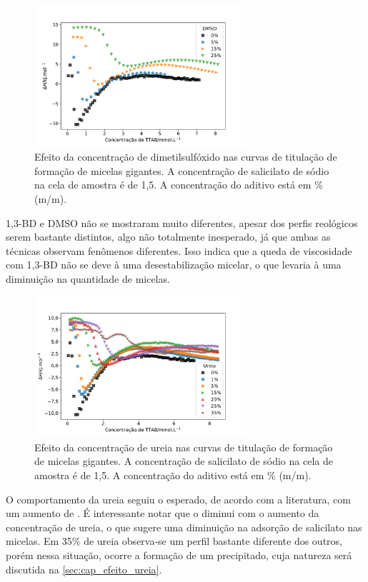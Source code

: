 			\begin{figure}[h]
				\centering
				\includegraphics[width=0.7\textwidth]{imagens/itc/ITC_MG_dmso}
				\caption{Efeito da concentração de dimetilsulfóxido nas curvas de titulação de formação de micelas gigantes. A concentração de salicilato de sódio na cela de amostra é de 1,5\mM. A concentração do aditivo está em \% (m/m).}
				\label{fig:itc_mg_dmso}
			\end{figure}

			1,3-BD e DMSO não se mostraram muito diferentes, apesar dos perfis reológicos serem bastante distintos, algo não totalmente inesperado, já que ambas as técnicas observam fenômenos diferentes. Isso indica que a queda de viscosidade com 1,3-BD não se deve à uma desestabilização micelar, o que levaria à uma diminuição na quantidade de micelas.

			\begin{figure}[h]
				\centering
				\includegraphics[width=0.7\textwidth]{imagens/itc/ITC_MG_ur}
				\caption{Efeito da concentração de ureia nas curvas de titulação de formação de micelas gigantes. A concentração de salicilato de sódio na cela de amostra é de 1,5\mM. A concentração do aditivo está em \% (m/m).}
				\label{fig:itc_mg_ureia}
			\end{figure}
		
			O comportamento da ureia seguiu o esperado, de acordo com a literatura, com um aumento de \cwlm{}. É interessante notar que o \DHwlm{} diminui com o aumento da concentração de ureia, o que sugere uma diminuição na adsorção de salicilato nas micelas. Em 35\% de ureia observa-se um perfil bastante diferente dos outros, porém nessa situação, ocorre a formação de um precipitado, cuja natureza será discutida na \autoref{sec:cap_efeito_ureia}.
			

